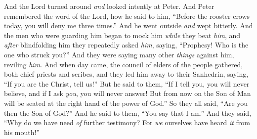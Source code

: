 \begin{biblechapter}
\verse And the Lord turned around \textit{and} looked intently at Peter. And Peter remembered the word of the Lord, how he said to him, “Before the rooster crows today, you will deny me three times.”
\verse And he went outside \textit{and} wept bitterly.
\verse And the men who were guarding him began to mock him \textit{while} they beat \textit{him},
\verse and \textit{after} blindfolding him they repeatedly asked \textit{him}, saying, “Prophesy! Who is the one who struck you?”
\verse And they were saying many other \textit{things} against him, reviling \textit{him}.
 And when day came, the council of elders of the people gathered, both chief priests and scribes, and they led him away to their Sanhedrin,
\verse saying, “If you are the Christ, tell us!” But he said to them, “If I tell you, you will never believe,
\verse and if I ask \textit{you}, you will never answer!
\verse But from now on the Son of Man will be seated at the right hand of the power of God.”
\verse So they all said, “Are you then the Son of God?” And he said to them, “You say that I am.”
\verse And they said, “Why do we have need \textit{of} further testimony? For \textit{we} ourselves have heard \textit{it} from his mouth!”
\end{biblechapter}

